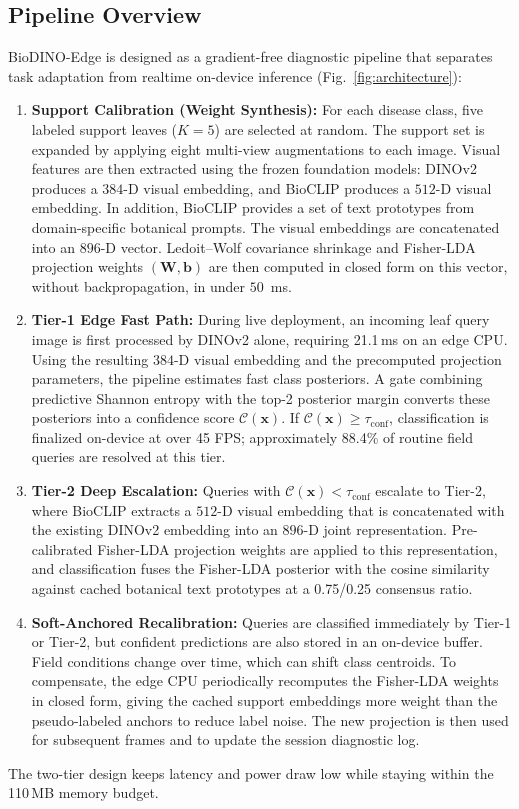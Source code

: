 \documentclass[conference]{IEEEtran}
\begin{document}
\subsection{Pipeline Overview}
\label{sec:pipeline_overview}
BioDINO-Edge is designed as a gradient-free diagnostic pipeline that separates task adaptation from realtime on-device inference (Fig.~\ref{fig:architecture}):
\begin{enumerate}
    \item \textbf{Support Calibration (Weight Synthesis):} For each disease class, five labeled support leaves ($K=5$) are selected at random. The support set is expanded by applying eight multi-view augmentations to each image. Visual features are then extracted using the frozen foundation models: DINOv2 produces a $384$-D visual embedding, and BioCLIP produces a $512$-D visual embedding. In addition, BioCLIP provides a set of text prototypes from domain-specific botanical prompts. The visual embeddings are concatenated into an $896$-D vector. Ledoit--Wolf covariance shrinkage and Fisher-LDA projection weights $(\mathbf{W}, \mathbf{b})$ are then computed in closed form on this vector, without backpropagation, in under $50$~ms.
    \item \textbf{Tier-1 Edge Fast Path:} During live deployment, an incoming leaf query image is first processed by DINOv2 alone, requiring 21.1\,ms on an edge CPU. Using the resulting $384$-D visual embedding and the precomputed projection parameters, the pipeline estimates fast class posteriors. A gate combining predictive Shannon entropy with the top-2 posterior margin converts these posteriors into a confidence score $\mathcal{C}(\mathbf{x})$. If $\mathcal{C}(\mathbf{x}) \ge \tau_{\text{conf}}$, classification is finalized on-device at over 45 FPS; approximately 88.4\% of routine field queries are resolved at this tier.
    \item \textbf{Tier-2 Deep Escalation:} Queries with $\mathcal{C}(\mathbf{x}) < \tau_{\text{conf}}$ escalate to Tier-2, where BioCLIP extracts a $512$-D visual embedding that is concatenated with the existing DINOv2 embedding into an $896$-D joint representation. Pre-calibrated Fisher-LDA projection weights are applied to this representation, and classification fuses the Fisher-LDA posterior with the cosine similarity against cached botanical text prototypes at a 0.75/0.25 consensus ratio.
    \item \textbf{Soft-Anchored Recalibration:} Queries are classified immediately by Tier-1 or Tier-2, but confident predictions are also stored in an on-device buffer. Field conditions change over time, which can shift class centroids. To compensate, the edge CPU periodically recomputes the Fisher-LDA weights in closed form, giving the cached support embeddings more weight than the pseudo-labeled anchors to reduce label noise. The new projection is then used for subsequent frames and to update the session diagnostic log.
\end{enumerate}
The two-tier design keeps latency and power draw low while staying within the 110\,MB memory budget.
\end{document}
